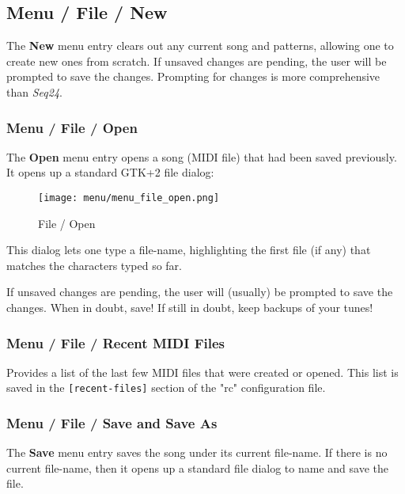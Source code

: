 \subsection{Menu / File / New}
\label{subsec:menu_file_new}

   The \textbf{New} menu entry clears out any current song and patterns,
   allowing one to create new ones from scratch.
   If unsaved changes are pending, the user will be prompted to save the
   changes.  Prompting for changes is more comprehensive than \textsl{Seq24}.

\subsubsection{Menu / File / Open}
\label{subsubsec:seq64_menu_file_open}

   The \textbf{Open} menu entry opens a song (MIDI file)
   that had been saved previously.  It opens up a standard GTK+2 file dialog:

\begin{figure}[H]
   \centering 
   \texttt{[image: menu/menu\_file\_open.png]}
   \caption{File / Open}
   \label{fig:seq64_menu_file_open}
\end{figure}

   This dialog lets one type a file-name, highlighting the first file (if any)
   that matches the characters typed so far.

   If unsaved changes are pending, the user will (usually)
   be prompted to save the changes.
   When in doubt, save!  If still in doubt, keep backups of your tunes!

\subsubsection{Menu / File / Recent MIDI Files}
\label{subsubsec:seq64_menu_file_recent}

   Provides a list of the last few MIDI files that were created or opened.
   This list is saved in the \texttt{[recent-files]} section of the
   "rc" configuration file.

\subsubsection{Menu / File / Save and Save As}
\label{subsubsec:menu_file_open_save_as}

   The \textbf{Save} menu entry saves the song under its current file-name.
   If there is no current file-name, then it opens up a standard file
   dialog to name and save the file.

